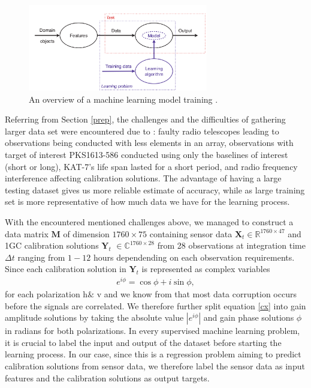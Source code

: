 \begin{figure}[H]
  \centering
    \includegraphics[width=0.7\textwidth]{images/MLSampler.png}
    \caption{An overview of a machine learning model training \citep{flach2012machine}.}
  \label{overview}
\end{figure}

Referring from Section \ref{prep}, the challenges and the difficulties of gathering  larger data set were encountered  due to : faulty radio telescopes leading to observations being conducted with less elements in an array, observations with target of interest PKS1613-586 conducted using only the baselines of interest (short or long), KAT-7's life span lasted for a short period, and radio frequency interference affecting calibration solutions. The advantage of having a large testing dataset gives us more reliable estimate of accuracy, while as large training set is more representative of how much data we have for the learning process. 

With the encountered mentioned challenges above, we managed to construct a data matrix $\textbf{M}$ of dimension  $1760\times 75$ containing sensor data $\textbf{X}_t\in \mathbb{R}^{1760 \times 47}$ and 1GC calibration solutions $\textbf{Y}_t$ $\in \mathbb{C}^{1760 \times 28}$ from 28 observations at integration time $\Delta t$ ranging from $1-12$ hours dependending on each observation requirements. Since each calibration solution in $\textbf{Y}_t$ is represented as complex variables \begin{align}
e^{i\phi}= \cos\phi + i\sin\phi, \label{cx}
\end{align} for each polarization h$\&$ v and we know from \citep{taylor1999synthesis} that most data corruption occurs before the signals are correlated. We therefore further split equation \ref{cx} into gain amplitude solutions by taking the absolute value  $\left|e^{i\phi}\right|$ and gain phase solutions $\phi$ in radians for both polarizations. In every supervised machine learning problem, it is crucial to label the input and output of the dataset before starting the learning process. In our case, since this is a regression problem aiming to predict calibration solutions from sensor data, we therefore label the sensor data as input features and the calibration solutions as output targets.
    
